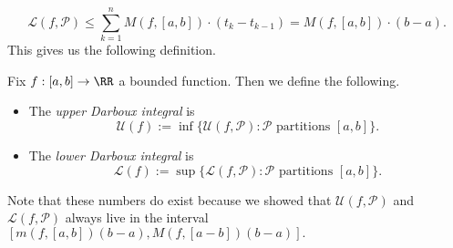 \documentclass[../notes.tex]{subfiles}
\begin{document}
\[\mathcal L(f,\mathcal P)\le\sum_{k=1}^nM(f,[a,b])\cdot(t_k-t_{k-1})=M(f,[a,b])\cdot(b-a).\]
This gives us the following definition.
\begin{definition}
	Fix $f:[a,b]\to\RR$ a bounded function. Then we define the following.
	\begin{itemize}
		\item The \textit{upper Darboux integral} is
		\[\mathcal U(f):=\inf\{\mathcal U(f,\mathcal P):\mathcal P\text{ partitions }[a,b]\}.\]
		\item The \textit{lower Darboux integral} is
		\[\mathcal L(f):=\sup\{\mathcal L(f,\mathcal P):\mathcal P\text{ partitions }[a,b]\}.\]
	\end{itemize}
\end{definition}
Note that these numbers do exist because we showed that $\mathcal U(f,\mathcal P)$ and $\mathcal L(f,\mathcal P)$ always live in the interval $[m(f,[a,b])(b-a), M(f,[a-b])(b-a)].$
\end{document}
